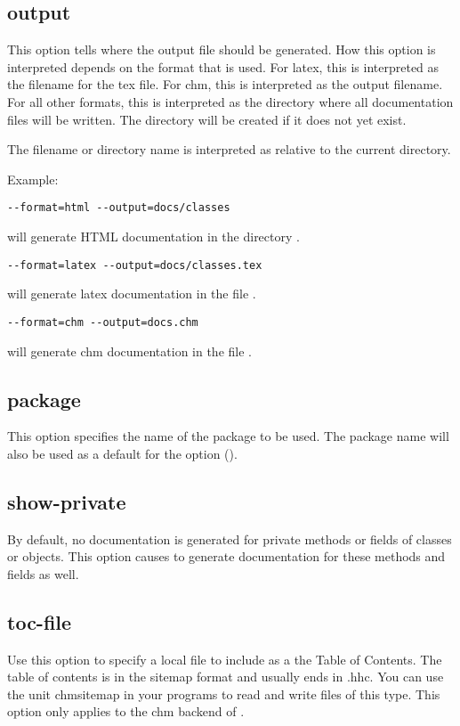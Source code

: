 \subsection{output}
\label{suse:output}
This option tells  \fpdoc where the output file should be generated. 
How this option is interpreted depends on the format that is used. 
For latex, this is interpreted as the filename for the tex file. 
For chm, this is interpreted as the output filename.
For all other formats, this is interpreted as the directory where all 
documentation files will be written. The directory will be created if 
it does not yet exist.

The filename or directory name is interpreted as relative to the current
directory.

Example:
\begin{verbatim}
--format=html --output=docs/classes
\end{verbatim}
will generate HTML documentation in the directory .
\begin{verbatim}
--format=latex --output=docs/classes.tex
\end{verbatim}
will generate latex documentation in the file .
\begin{verbatim}
--format=chm --output=docs.chm
\end{verbatim}
will generate chm documentation in the file .

\subsection{package}
\label{suse:package}
This option specifies the name of the package to be used. The package name
will also be used as a default for the  option ().

\subsection{show-private}
\label{suse:showprivate}
By default, no documentation is generated for private methods or fields of
classes or objects. This option causes \fpdoc to generate documentation 
for these methods and fields as well.

\subsection{toc-file}
Use this option to specify a local file to include as a the Table of Contents.
The table of contents is in the sitemap format and usually ends in .hhc. You
can use the unit chmsitemap in your programs to read and write files of this type.
This option only applies to the chm backend of \fpdoc.


